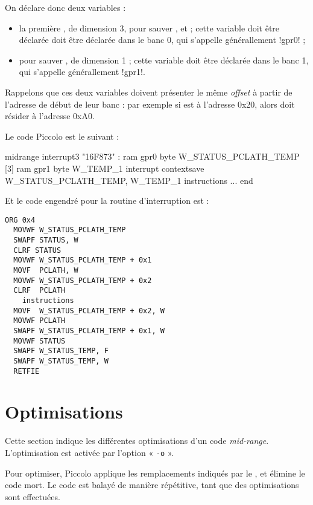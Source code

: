 \begin{piccolo}
On déclare donc deux variables :
\begin{itemize}
  \item la première , de dimension 3, pour sauver ,  et  ; cette variable doit être déclarée doit être déclarée dans le banc 0, qui s'appelle générallement \pic!gpr0! ; 
  \item {} pour sauver , de dimension 1 ; cette variable doit être déclarée dans le banc 1, qui s'appelle générallement \pic!gpr1!.

\end{itemize}

Rappelons que ces deux variables doivent présenter le même \emph{offset} à partir de l'adresse de début de leur banc : par exemple si  est à l'adresse 0x20, alors  doit résider à l'adresse 0xA0.

Le code Piccolo est le suivant :
\begin{piccolo}
midrange interrupt3 "16F873" :
ram gpr0 {
  byte W_STATUS_PCLATH_TEMP [3]
}
ram gpr1 {
  byte W_TEMP_1
}
interrupt contextsave W_STATUS_PCLATH_TEMP, W_TEMP_1 {
  instructions
}
...
end
\end{piccolo}

Et le code engendré pour la routine d'interruption est :
\begin{lstlisting}[language=assembleur]
  ORG 0x4
  MOVWF W_STATUS_PCLATH_TEMP
  SWAPF STATUS, W
  CLRF STATUS
  MOVWF W_STATUS_PCLATH_TEMP + 0x1
  MOVF  PCLATH, W
  MOVWF W_STATUS_PCLATH_TEMP + 0x2
  CLRF  PCLATH
    instructions
  MOVF  W_STATUS_PCLATH_TEMP + 0x2, W
  MOVWF PCLATH
  SWAPF W_STATUS_PCLATH_TEMP + 0x1, W
  MOVWF STATUS
  SWAPF W_STATUS_TEMP, F
  SWAPF W_STATUS_TEMP, W
  RETFIE
\end{lstlisting}









\section{Optimisations}

Cette section indique les différentes optimisations d'un code \emph{mid-range}. L'optimisation est activée par l'option « \texttt{-o} ».

Pour optimiser, Piccolo applique les remplacements indiqués par le , et élimine le code mort. Le code est balayé de manière répétitive, tant que des optimisations sont effectuées.


\end{piccolo}
